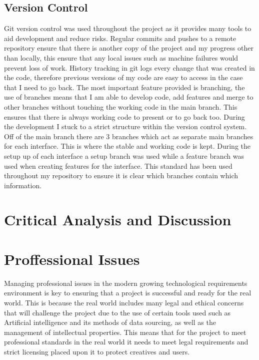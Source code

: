 \documentclass[]{project_final}
\begin{document}
\section{Version Control}
Git version control was used throughout the project as it provides many tools to aid development and reduce risks. Regular commits and pushes to a remote repository ensure that
there is another copy of the project and my progress other than locally, this ensure that any
local issues such as machine failures would prevent loss of work.
History tracking in git logs every change that was created in the code, therefore previous
versions of my code are easy to access in the case that I need to go back.
The most important feature provided is branching, the use of branches means that I am able
to develop code, add features and merge to other branches without touching the working
code in the main branch. This ensures that there is always working code to present or to go
back too.
During the development I stuck to a strict structure within the version control system. Off of
the main branch there are 3 branches which act as separate main branches for each interface.
This is where the stable and working code is kept. During the setup up of each interface
a setup branch was used while a feature branch was used when creating features for the
interface. This standard has been used throughout my repository to ensure it is clear which
branches contain which information.


\chapter{Critical Analysis and Discussion}

\chapter{Proffessional Issues}

Managing professional issues in the modern growing technological requirements environment is key to ensuring that a project  is successful and ready for the real world. This is because the real world includes many legal and ethical concerns that will challenge the project due to the use of certain tools used such as Artificial intelligence and its methods of data sourcing, as well as the management of intellectual properties. This means that for the project to meet professional standards in the real world it needs to meet legal requirements and strict licensing placed upon it to protect creatives and users.
\end{document}
